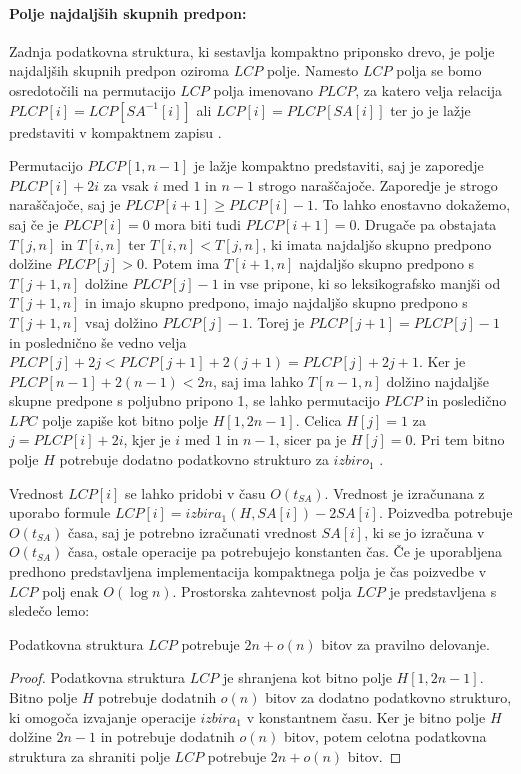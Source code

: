 \paragraph{Polje najdaljših skupnih predpon:}
Zadnja podatkovna struktura, ki sestavlja kompaktno priponsko drevo, je polje najdaljših skupnih predpon oziroma $LCP$ polje. Namesto $LCP$ polja se bomo osredotočili na permutacijo $LCP$ polja imenovano $PLCP$, za katero velja relacija $PLCP[i]=LCP[SA^{-1}[i]]$ ali $LCP[i]=PLCP[SA[i]]$ ter jo je lažje predstaviti v kompaktnem zapisu \cite{Navarro2016, Sadakane2007}.


Permutacijo $PLCP[1,n-1]$ je lažje kompaktno predstaviti, saj je zaporedje $PLCP[i]+2i$ za vsak $i$ med $1$ in $n-1$ strogo naraščajoče. Zaporedje je strogo naraščajoče, saj je $PLCP[i+1]\ge PLCP[i]-1$. To lahko enostavno dokažemo, saj če je $PLCP[i]=0$ mora biti tudi $PLCP[i+1]=0$. Drugače pa obstajata $T[j,n]$ in $T[i,n]$ ter $T[i,n]<T[j,n]$, ki imata najdaljšo skupno predpono dolžine $PLCP[j]>0$. Potem ima $T[i+1,n]$ najdaljšo skupno predpono s $T[j+1,n]$ dolžine $PLCP[j]-1$ in vse pripone, ki so leksikografsko manjši od $T[j+1,n]$ in imajo skupno predpono, imajo najdaljšo skupno predpono s $T[j+1,n]$ vsaj dolžino $PLCP[j]-1$. Torej je $PLCP[j+1] = PLCP[j]-1$ in poslednično še vedno velja $PLCP[j]+2j<PLCP[j+1]+2(j+1)= PLCP[j]+2j+1$. Ker je $PLCP[n-1]+2(n-1)< 2n$, saj ima lahko $T[n-1,n]$ dolžino najdaljše skupne predpone s poljubno pripono 1, se lahko permutacijo $PLCP$ in posledično $LPC$ polje zapiše kot bitno polje $H[1,2n-1]$. Celica $H[j]=1$ za $j=PLCP[i]+2i$, kjer je $i$ med $1$ in $n-1$, sicer pa je $H[j]=0$. Pri tem bitno polje $H$ potrebuje dodatno podatkovno strukturo za $izbiro_1$ \cite{Navarro2016, Sadakane2007}.

Vrednost $LCP[i]$ se lahko pridobi v času $O(t_{SA})$. Vrednost je izračunana z uporabo formule $LCP[i]=izbira_1(H,SA[i])-2SA[i]$. Poizvedba potrebuje $O(t_{SA})$ časa, saj je potrebno izračunati vrednost $SA[i]$, ki se jo izračuna v $O(t_{SA})$ časa, ostale operacije pa potrebujejo konstanten čas. Če je uporabljena predhono predstavljena implementacija kompaktnega polja je čas poizvedbe v $LCP$ polj enak $O(\log{n})$. Prostorska zahtevnost polja $LCP$ je predstavljena s sledečo lemo:

\begin{lema}\label{lema:LCP}
 Podatkovna struktura $LCP$ potrebuje $2n+o(n)$ bitov za pravilno delovanje.
\end{lema}

\begin{proof}
    Podatkovna struktura $LCP$ je shranjena kot bitno polje $H[1,2n-1]$. Bitno polje $H$ potrebuje dodatnih $o(n)$ bitov za dodatno podatkovno strukturo, ki omogoča izvajanje operacije $izbira_1$ v konstantnem času. Ker je bitno polje $H$ dolžine $2n-1$ in potrebuje dodatnih $o(n)$ bitov, potem celotna podatkovna struktura za shraniti polje $LCP$ potrebuje $2n+o(n)$ bitov.
\end{proof}


